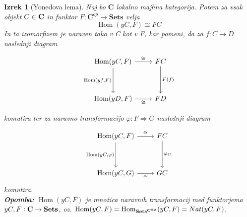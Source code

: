 \documentclass[12pt,a4paper]{book}
\theoremstyle{definition}
\theoremstyle{plain}
\newtheorem{izrek}[definicija]{Izrek}
\theoremstyle{definition}
\theoremstyle{remark}
\newcommand{\cat}[1]{\textbf{#1}}
\DeclareMathOperator{\Hom}{Hom}
\begin{document}
\begin{izrek}[Yonedova lema]
Naj bo $\cat{C}$ lokalno majhna kategorija. Potem za vsak objekt $C \in \bf{C}$ in funktor $F : \textbf{C}^{op} \to \textbf{Sets}$ velja
$$\Hom(yC,F) \cong FC$$
In ta izomorfizem je naraven tako v C kot v F, kar pomeni, da za $f : C \to D$ naslednji diagram

\begin{equation} \label{diag1}
\begin{tikzcd}[row sep=huge]
\Hom(yC,F) \arrow[r, "\cong"] \arrow[d, "{\Hom(yf,F)}"'] & FC \arrow[d, "F(f)"] \\
\Hom(yD,F) \arrow[r, "\cong"'] & FD
\end{tikzcd}
\end{equation}


komutira ter za naravno transformacijo $\varphi : F \Rightarrow G$ naslednji diagram

\begin{equation} \label{diag2}
\begin{tikzcd}[row sep=huge]
\Hom(yC,F) \arrow[r, "\cong"] \arrow[d, "{\Hom(yC,}\varphi\text{)}"'] & FC \arrow[d, "\varphi_C"] \\
\Hom(yC,G) \arrow[r, "\cong"']	&	GC
\end{tikzcd}
\end{equation}
komutira. \\
\textbf{Opomba:} $\Hom(yC,F)$ je množica naravnih transformacij med funktorjema $yC,F : \bf{C} \to \bf{Sets}$, oz. $\Hom(yC,F) = \Hom_{\bf{Sets}^{\textbf{C}^{op}}}(yC,F) = Nat(yC,F)$.

\end{izrek}
\end{document}
